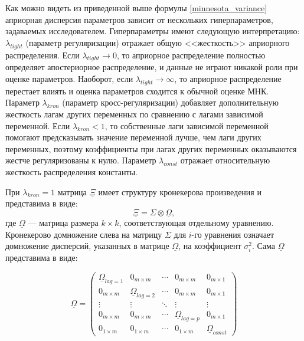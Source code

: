 \documentclass[11pt]{article} %
\newcommand{\prior}{\underline}
\begin{document}

Как можно видеть из приведенной выше формулы \eqref{minnesota_variance} априорная дисперсия параметров зависит от нескольких гиперпараметров, задаваемых исследователем. Гиперпараметры имеют следующую интерпретацию: $\lambda_{tight}$ (параметр регуляризации) отражает общую <<жесткость>> априорного распределения. Если $\lambda_{tight}\to 0$, то априорное распределение полностью определяет апостериорное распределение, и данные не играют никакой роли при оценке параметров. Наоборот, если $\lambda_{tight}\to \infty$, то априорное распределение перестает влиять и оценка параметров сходится к обычной оценке МНК. Параметр $\lambda_{kron}$ (параметр кросс-регуляризации) добавляет дополнительную жесткость лагам других переменных по сравнению с лагами зависимой переменной. Если  $\lambda_{kron}<1$, то собственные лаги зависимой переменной помогают предсказывать значение переменной лучше, чем лаги других переменных, поэтому коэффициенты при лагах других переменных оказываются жестче регуляризованы к нулю.   Параметр $\lambda_{const}$ отражает относительную жесткость распределения константы.

При $\lambda_{kron}=1$ матрица $\prior \Xi$ имеет структуру кронекерова произведения и представима в виде:
\[
\prior \Xi = \Sigma \otimes \prior \Omega,
\]
где $\prior \Omega$ --- матрица размера $k\times k$, соответствующая отдельному уравнению. Кронекерово домножение слева на матрицу $\Sigma$ для $i$-го уравнения означает домножение дисперсий, указанных в матрице $\prior \Omega$, на коэффициент $\sigma^2_i$. Сама  $\prior \Omega$ представима в виде: 


\begin{equation}
\prior \Omega=\begin{pmatrix} \label{prior_omega1}
\prior \Omega_{lag=1}&0_{m\times m}&\cdots&0_{m\times m}&0_{m\times 1}\\
0_{m\times m}& \prior\Omega_{lag=2}& \cdots &0_{m\times m}&0_{m\times 1}\\
\vdots &\vdots& \ddots&\vdots& \vdots\\
0_{m\times m}&0_{m\times m}&\cdots&\prior\Omega_{lag=p} & 0_{m\times 1}\\
0_{1\times m}&0_{1\times m}&\cdots&0_{1\times m}&\prior \Omega_{const}
\end{pmatrix} 
\end{equation}
\end{document}
